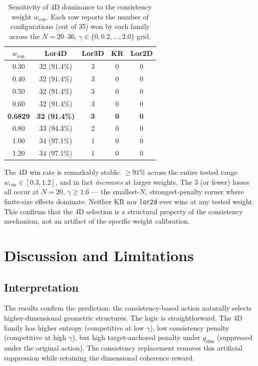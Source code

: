 \documentclass[entropy,article,submit,pdftex,moreauthors]{Definitions/mdpi}
\begin{document}
\begin{table}[H]
\centering
\caption{Sensitivity of 4D dominance to the consistency weight $w_{\text{con}}$. Each row reports the number of configurations (out of 35) won by each family across the $N = 20$--$36$, $\gamma \in \{0, 0.2, \ldots, 2.0\}$ grid.}
\label{tab:wcon}
\begin{tabular}{ccccc}
\toprule
$w_{\text{con}}$ & \textbf{Lor4D} & \textbf{Lor3D} & \textbf{KR} & \textbf{Lor2D} \\
\midrule
0.30 & 32 (91.4\%) & 3 & 0 & 0 \\
0.40 & 32 (91.4\%) & 3 & 0 & 0 \\
0.50 & 32 (91.4\%) & 3 & 0 & 0 \\
0.60 & 32 (91.4\%) & 3 & 0 & 0 \\
\textbf{0.6829} & \textbf{32 (91.4\%)} & \textbf{3} & \textbf{0} & \textbf{0} \\
0.80 & 33 (94.3\%) & 2 & 0 & 0 \\
1.00 & 34 (97.1\%) & 1 & 0 & 0 \\
1.20 & 34 (97.1\%) & 1 & 0 & 0 \\
\bottomrule
\end{tabular}
\end{table}

The 4D win rate is remarkably stable: $\geq 91\%$ across the entire tested range $w_{\text{con}} \in [0.3, 1.2]$, and in fact \emph{increases} at larger weights. The 3 (or fewer) losses all occur at $N = 20$, $\gamma \geq 1.6$ --- the smallest-$N$, strongest-penalty corner where finite-size effects dominate. Neither KR nor \texttt{lor2d} ever wins at any tested weight. This confirms that the 4D selection is a structural property of the consistency mechanism, not an artifact of the specific weight calibration.

\section{Discussion and Limitations}

\subsection{Interpretation}

The results confirm the prediction: the consistency-based action naturally selects higher-dimensional geometric structures. The logic is straightforward. The 4D family has higher entropy (competitive at low $\gamma$), low consistency penalty (competitive at high $\gamma$), but high target-anchored penalty under $g_{\text{dim}}$ (suppressed under the original action). The consistency replacement removes this artificial suppression while retaining the dimensional coherence reward.
\end{document}
